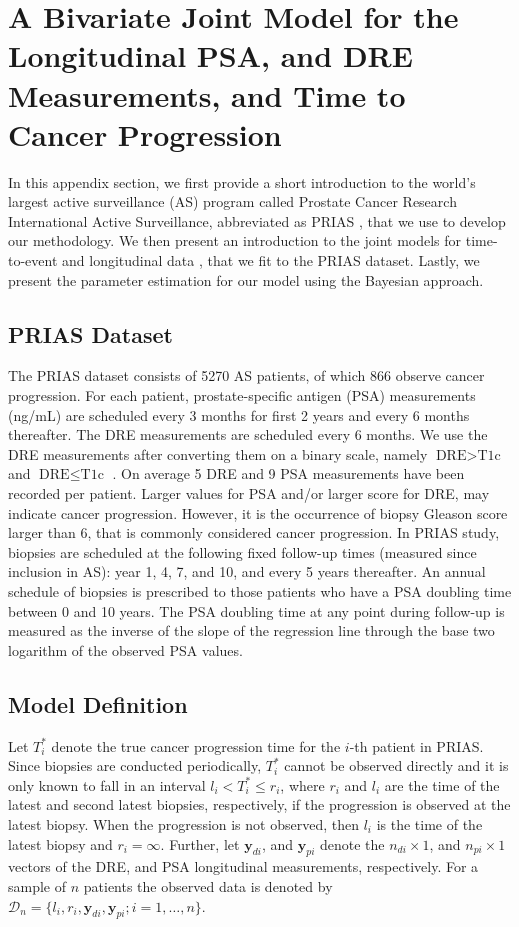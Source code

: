 \section{A Bivariate Joint Model for the Longitudinal PSA, and DRE Measurements, and Time to Cancer Progression}
\label{sec:jm_framework}
In this appendix section, we first provide a short introduction to the world's largest active surveillance (AS) program called Prostate Cancer Research International Active Surveillance, abbreviated as PRIAS \citep{bul2013active}, that we use to develop our methodology. We then present an introduction to the joint models for time-to-event and longitudinal data \citep{tsiatis2004joint,rizopoulos2012joint}, that we fit to the PRIAS dataset.  Lastly, we present the parameter estimation for our model using the Bayesian approach. 

\subsection{PRIAS Dataset}
The PRIAS dataset consists of 5270 AS patients, of which 866 observe cancer progression. For each patient, prostate-specific antigen (PSA) measurements (ng/mL) are scheduled every 3 months for first 2 years and every 6 months thereafter. The DRE measurements are scheduled every 6 months. We use the DRE measurements after converting them on a binary scale, namely $\mbox{DRE} > \mbox{T1c}$ and $\mbox{DRE} \leq \mbox{T1c}$ \cite{schroder1992tnm}. On average 5 DRE and 9 PSA measurements have been recorded per patient. Larger values for PSA and/or larger score for DRE, may indicate cancer progression. However, it is the occurrence of biopsy Gleason score larger than 6, that is commonly considered cancer progression. In PRIAS study, biopsies are scheduled at the  following fixed follow-up times (measured since inclusion in AS): year 1, 4, 7, and 10, and every 5 years thereafter. An annual schedule of biopsies is prescribed to those patients who have a PSA doubling time between 0 and 10 years. The PSA doubling time at any point during follow-up is measured as the inverse of the slope of the regression line through the base two logarithm of the observed PSA values.

\subsection{Model Definition}
\label{subsec:model_def}
Let $T_i^*$ denote the true cancer progression time for the $i$-th patient in PRIAS. Since biopsies are conducted periodically, $T_i^*$ cannot be observed directly and it is only known to fall in an interval ${l_i < T_i^* \leq r_i}$, where $r_i$ and $l_i$ are the time of the latest and second latest biopsies, respectively, if the progression is observed at the latest biopsy. When the progression is not observed, then $l_i$ is the time of the latest biopsy and $r_i = \infty$. Further, let $\boldsymbol{y}_{di}$, and $\boldsymbol{y}_{pi}$ denote the $n_{di} \times 1$, and $n_{pi} \times 1$ vectors of the DRE, and PSA longitudinal measurements, respectively. For a sample of $n$ patients the observed data is denoted by ${\mathcal{D}_n = \{l_i, r_i, \boldsymbol{y}_{di}, \boldsymbol{y}_{pi}; i = 1, \ldots, n\}}$.

